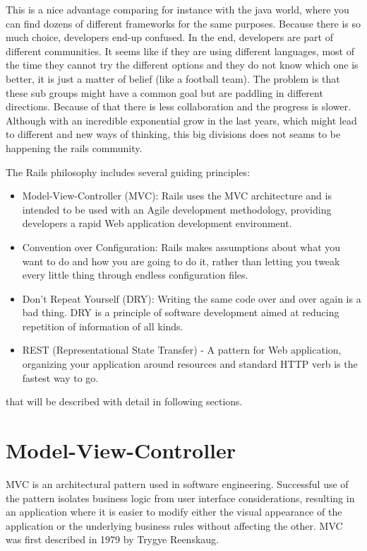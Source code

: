 This is a nice advantage comparing for instance with the java world, 
where you can find dozens of different frameworks for the same purposes.
Because there is so much choice, developers end-up confused.
In the end, developers are part of different communities. 
It seems like if they are using different languages, most of the time
they cannot try the different options and they do not know which one is better, 
it is just a matter of belief (like a football team).
The problem is that these sub groups might have a common goal but
are paddling in different directions.
Because of that there is less collaboration and the progress is slower.
Although with an incredible exponential grow in the last years,
which might lead to different and new ways of thinking, 
this big divisions does not seams to be happening the rails community.

The Rails philosophy includes several guiding principles:
\begin{itemize}
\item Model-View-Controller (MVC): Rails uses the MVC architecture and 
      is intended to be used with an Agile development methodology,
      providing developers a rapid Web application development environment.
\item Convention over Configuration: Rails makes assumptions about 
      what you want to do and how you are going to do it, 
      rather than letting you tweak every little thing through endless configuration files.
\item Don’t Repeat Yourself (DRY): Writing the same code over and over again is a bad thing. 
      DRY is a principle of software development aimed at reducing repetition of information of all kinds.
\item REST (Representational State Transfer) - A pattern for Web application, 
      organizing your application around resources and standard HTTP verb is the fastest way to go.
\end{itemize}
that will be described with detail in following sections.


\section{Model-View-Controller} 
MVC is an architectural pattern used in software engineering. 
Successful use of the pattern isolates business logic from user interface considerations, 
resulting in an application where it is easier to modify either the visual appearance of the application 
or the underlying business rules without affecting the other.
MVC was first described in 1979 by Trygye Reenskaug.

